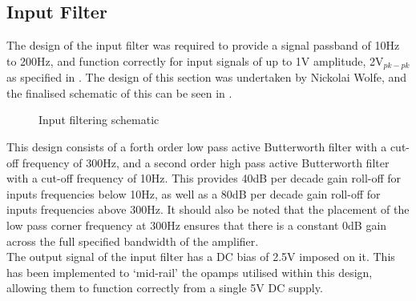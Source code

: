 \documentclass[a4paper,11pt]{article}
\begin{document}
\subsection{Input Filter}

The design of the input filter was required to provide a signal passband of 10Hz to 200Hz, and function correctly for input signals of up to 1V amplitude, 2V$_{pk-pk}$ as specified in . The design of this section was undertaken by Nickolai Wolfe, and the finalised schematic of this can be seen in .


\begin{figure}[h!]
    \centering
    \caption{Input filtering schematic}
    \label{F:input_filter_design}
\end{figure}

This design consists of a forth order low pass active Butterworth filter with a cut-off frequency of 300Hz, and a second order high pass active Butterworth filter with a cut-off frequency of 10Hz. This provides 40dB per decade gain roll-off for inputs frequencies below 10Hz, as well as a 80dB per decade gain roll-off for inputs frequencies above 300Hz. It should also be noted that the placement of the low pass corner frequency at 300Hz ensures that there is a constant 0dB gain across the full specified bandwidth of the amplifier. \\

The output signal of the input filter has a DC bias of 2.5V imposed on it. This has been implemented to `mid-rail' the opamps utilised within this design, allowing them to function correctly from a single 5V DC supply.
\end{document}

